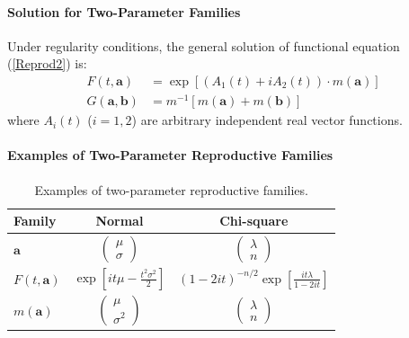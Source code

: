 \paragraph{Solution for Two-Parameter Families}
Under regularity conditions, the general solution of functional equation (\ref{Reprod2}) is:
\begin{align}
F(t, \mathbf{a}) &= \exp[(A_1(t) + iA_2(t)) \cdot m(\mathbf{a})] \\
G(\mathbf{a}, \mathbf{b}) &= m^{-1}[m(\mathbf{a}) + m(\mathbf{b})]
\end{align}
where $A_i(t)$ ($i = 1, 2$) are arbitrary independent real vector functions.

\paragraph{Examples of Two-Parameter Reproductive Families}
\begin{table}[H]
\centering
\begin{tabular}{|l|c|c|}
\hline
\textbf{Family} & \textbf{Normal} & \textbf{Chi-square} \\
\hline
$\mathbf{a}$ & $\begin{pmatrix} \mu \\ \sigma \end{pmatrix}$ & $\begin{pmatrix} \lambda \\ n \end{pmatrix}$ \\
\hline
$F(t, \mathbf{a})$ & $\exp\left[it\mu - \frac{t^2\sigma^2}{2}\right]$ & $(1-2it)^{-n/2}\exp\left[\frac{it\lambda}{1-2it}\right]$ \\
\hline
$m(\mathbf{a})$ & $\begin{pmatrix} \mu \\ \sigma^2 \end{pmatrix}$ & $\begin{pmatrix} \lambda \\ n \end{pmatrix}$ \\
\hline
\end{tabular}
\caption{Examples of two-parameter reproductive families.}
\label{tab:reproductive_two}
\end{table}

